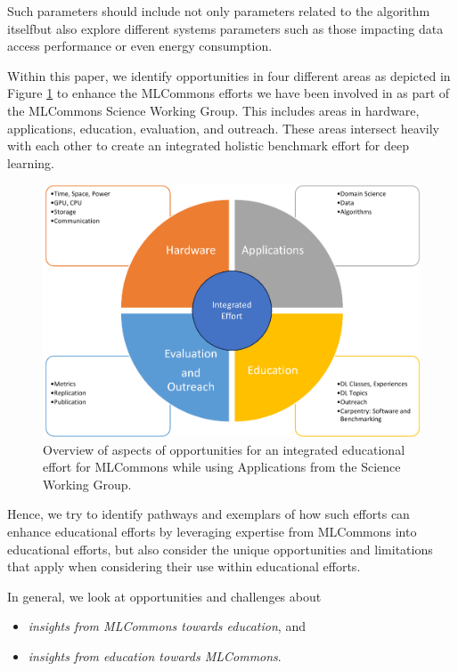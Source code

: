 \documentclass[utf8]{FrontiersinVancouver} %
\begin{document}
Such parameters should include not only parameters related to the algorithm itselfbut also explore different systems parameters such as those impacting data access performance or even energy consumption.

Within this paper, we identify opportunities in four different areas as depicted in Figure \ref{fig:opportunities} to enhance the MLCommons efforts we have been involved in as part of the MLCommons Science Working Group. This includes areas in hardware, applications, education, evaluation, and outreach. These areas intersect heavily with each other to create an integrated holistic benchmark effort for deep learning.    


\begin{figure}[htb]
    \centering\includegraphics[width=0.5\columnwidth]{images/frontiers-eq-overview}
    \caption{Overview of aspects of opportunities for an integrated educational effort for MLCommons while using Applications from the Science Working Group.}
    \label{fig:opportunities}
\end{figure}

Hence, we try to identify pathways and exemplars of how such efforts can enhance educational efforts by leveraging expertise from MLCommons into educational efforts, but also consider the unique opportunities and limitations that apply when considering their use within educational efforts.

In general, we look at opportunities and challenges about 

\begin{itemize}
\item {\em insights from MLCommons towards education}, and 
\item {\em insights from education towards MLCommons}.
\end{itemize}
\end{document}
